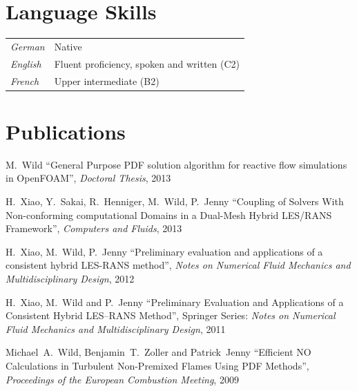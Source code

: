 \documentclass[line,11pt,a4paper]{resume}
\begin{document}
\begin{resume}
\section{\mysidestyle Language Skills}\vspace{2mm}
\begin{tabular}{@{}ll}
  \textsl{German}  & Native \\
  \textsl{English} & Fluent proficiency, spoken and written (C2) \\
  \textsl{French}  & Upper intermediate (B2) \\
\end{tabular}

\section{\mysidestyle Publications}\vspace{2mm}
M.~Wild
``General Purpose PDF solution algorithm for reactive flow simulations in
OpenFOAM'', \textsl{Doctoral Thesis}, 2013

\vspace{-3mm}
H.~Xiao, Y.~Sakai, R.~Henniger, M.~Wild, P.~Jenny
``Coupling of Solvers With Non-conforming computational Domains in a Dual-Mesh
Hybrid LES/RANS Framework'', \textsl{Computers and Fluids}, 2013

\vspace{-3mm}
H.~Xiao, M.~Wild, P.~Jenny
``Preliminary evaluation and applications of a consistent hybrid LES-RANS
method'', \textsl{Notes on Numerical Fluid Mechanics and Multidisciplinary
Design}, 2012

\vspace{-3mm}
H.~Xiao, M.~Wild and P.~Jenny ``Preliminary Evaluation and
Applications of a Consistent Hybrid LES--RANS Method'', Springer Series:
\textsl{Notes on Numerical Fluid Mechanics and Multidisciplinary Design}, 2011

\vspace{-3mm}
Michael~A.~Wild, Benjamin~T.~Zoller and Patrick~Jenny
``Efficient NO Calculations in Turbulent Non-Premixed Flames Using
PDF Methods'', \textsl{Proceedings of the European Combustion Meeting}, 2009


\end{resume}
\end{document}
